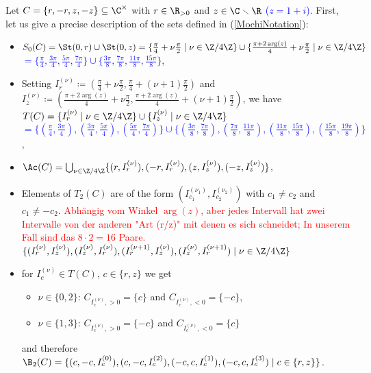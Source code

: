 \begin{ex}
Let $C =\{r,-r,z,-z\} \subseteq \C^\times$ with $r \in \R_{>0}$ and $z \in \C \smallsetminus \R$ \textcolor{blue}{($z = 1+i$)}. First, let us give a precise description of the sets defined in (\ref{MochiNotation}):
\begin{itemize}
    \item $S_0(C) = \St(0,r) \cup \St(0,z) = \{\frac{\pi}{4}+ \nu \frac{\pi}{2}\mid \nu \in \Z /4\Z\} \cup \{\frac{\pi+ 2\arg(z)}{4}+ \nu\frac{\pi}{2}\mid \nu \in \Z/4\Z\}$ \textcolor{blue}{$=\{\frac{\pi}{4},\frac{3\pi}{4},\frac{5\pi}{4},\frac{7\pi}{4} \} \cup \{\frac{3\pi}{8},\frac{7\pi}{8},\frac{11\pi}{8},\frac{15\pi}{8}\}$},
    \item Setting $I_r^{(\nu)} \coloneqq (\frac{\pi}{4} + \nu\frac{\pi}{2}, \frac{\pi}{4}+(\nu+1)\frac{\pi}{2})$ and $I_z^{(\nu)} \coloneqq (\frac{\pi+ 2 \arg(z)}{4}+ \nu\frac{\pi}{2}, \frac{\pi+ 2 \arg(z)}{4}+(\nu+1)\frac{\pi}{2})$, we have 
    $T(C) = \{I_r^{(\nu)} \mid \nu \in \Z/4\Z\} \cup \{I_z^{(\nu)} \mid \nu \in \Z/4\Z\}$ \textcolor{blue}{$=\{(\frac{\pi}{4},\frac{3\pi}{4}),(\frac{3\pi}{4},\frac{5\pi}{4}),(\frac{5\pi}{4},\frac{7\pi}{4})\} \cup \{(\frac{3\pi}{8},\frac{7\pi}{8}),(\frac{7\pi}{8},\frac{11\pi}{8}),(\frac{11\pi}{8},\frac{15\pi}{8}),(\frac{15\pi}{8},\frac{19\pi}{8})\}$},
    \item $\Ac(C) = \bigcup_{\nu \in \Z/4\Z} \{(r, I_r^{(\nu)}),(-r, I_r^{(\nu)}),(z, I_z^{(\nu)}),(-z,I_z^{(\nu)})\}$,
    \item Elements of $T_2(C)$ are of the form $(I_{c_1}^{(\nu_1)}, I_{c_2}^{(\nu_2)})$ with $c_1 \neq c_2$ and $c_1 \neq -c_2$. \textcolor{red}{Abhängig vom Winkel $\arg(z)$, aber jedes Intervall hat zwei Intervalle von der anderen "Art (r/z)" mit denen es sich schneidet; In unserem Fall sind das $8 \cdot 2=16$ Paare.}
    \textcolor{blue}{$\{(I_r^{(\nu)}, I_z^{(\nu)}), (I_z^{(\nu)}, I_r^{(\nu)}),(I_r^{(\nu+1)}, I_z^{(\nu)}),(I_z^{(\nu)}, I_r^{(\nu+1)})\mid \nu \in \Z/4\Z\}$}
    \item for $I_c^{(\nu)} \in T(C)$, $c \in \{r, z\}$ we get
    \begin{itemize}
        \item $\nu \in \{0,2\}$: $C_{I_c^{(\nu)}, >0} = \{c\}$ and $C_{I_c^{(\nu)}, <0} = \{-c\}$,
        \item $\nu \in \{1,3\}$: $C_{I_c^{(\nu)}, >0} = \{-c\}$ and $C_{I_c^{(\nu)}, <0} = \{c\}$
    \end{itemize}
    and therefore $\B_2(C) = \{(c,-c,I_c^{(0)}), (c,-c, I_c^{(2)}), (-c,c,I_c^{(1)}), (-c,c,I_c^{(3)}) \mid c \in \{r,z\}\}$.

\end{itemize}
\end{ex}
